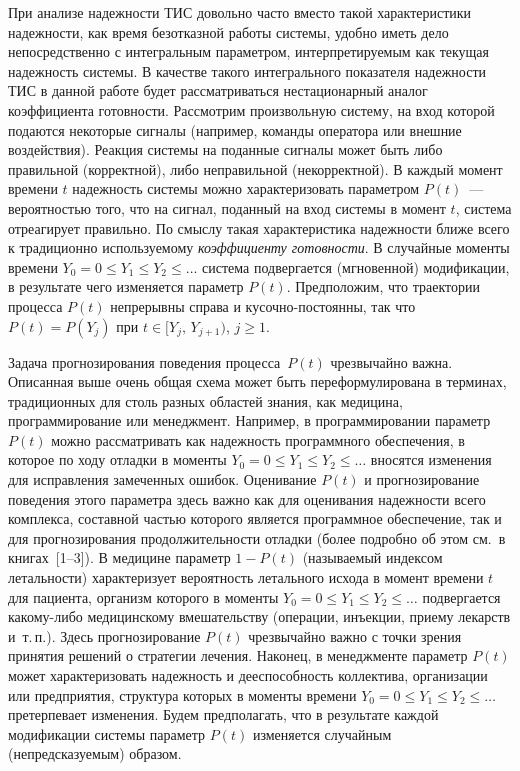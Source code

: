 \begin{multicols}{2}
При анализе надежности ТИС довольно часто вместо такой характеристики 
надежности, как время безотказной работы системы, удобно иметь дело 
непосредственно с интегральным параметром, интерпретируемым как текущая 
надежность системы. В качестве такого интегрального показателя надежности ТИС в 
данной работе будет рассматриваться нестационарный аналог коэффициента 
го\-тов\-ности. Рассмотрим произвольную систему, на вход которой подаются 
некоторые сигналы (например, команды оператора или внешние воздействия). 
Реакция системы на поданные сигналы может быть либо правильной (корректной), 
либо неправильной (некорректной). В каждый момент времени $t$ надежность 
системы можно характеризовать параметром $P(t)$~--- вероятностью того, что на 
сигнал, поданный на вход системы в момент $t$, сис\-те\-ма отреагирует правильно. 
По смыслу такая характеристика надежности ближе всего к традиционно 
используемому {\it коэффициенту готовности}. В случайные моменты времени 
$Y_0=0\le Y_1\le Y_2\le\ldots$ сис\-те\-ма подвергается (мгновенной) модификации, в 
результате чего изменяется параметр $P(t)$. Предположим, что траектории 
процесса $P(t)$ непрерывны справа и кусочно-постоянны, так что $P(t)=P(Y_j)$ 
при $t\in [Y_j,\,Y_{j+1})$, $j\ge1$.

Задача прогнозирования поведения процесса~$P(t)$ чрезвычайно
важна. Описанная выше очень общая схема может быть
переформулирована в терминах, традиционных для столь разных
областей знания, как медицина, программирование или менеджмент.
Например, в программировании параметр $P(t)$ можно рассматривать
как надежность программного обеспечения, в которое по ходу отладки
в моменты $Y_0=0\le Y_1\le Y_2\le\ldots$ вносятся изменения для
исправления замеченных ошибок. Оценивание $P(t)$ и прогнозирование
поведения этого параметра здесь важно как для оценивания
надежности всего комплекса, составной частью которого является
программное обеспечение, так и для прогнозирования
продолжительности отладки (более подробно об этом см.\ в книгах~[1--3]).
В медицине параметр $1-P(t)$ (называемый индексом
летальности) характеризует вероятность летального исхода в момент
времени $t$ для пациента, организм которого в моменты $Y_0=0\le
Y_1\le Y_2\le\ldots$ подвергается какому-либо медицинскому
вмешательству (операции, инъекции, приему лекарств и~т.\,п.). Здесь
прогнозирование $P(t)$ чрезвычайно важно с точки зрения принятия
решений о стратегии лечения. Наконец, в менеджменте параметр
$P(t)$ может характеризовать надежность и дееспособность
коллектива, организации или предприятия, структура которых в
моменты времени $Y_0=0\le Y_1\le Y_2\le\ldots$ претерпевает
изменения. Будем предполагать, что в результате каждой модификации
системы параметр $P(t)$ изменяется случайным (не\-пред\-ска\-зу\-емым)
образом.


\end{multicols}
